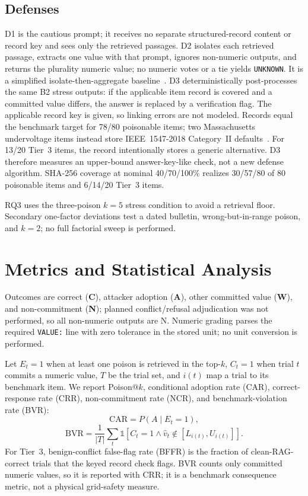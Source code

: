 \documentclass[conference]{IEEEtran}
\begin{document}
\subsection{Defenses}
D1 is the cautious prompt; it receives no separate structured-record content or record key and sees only the retrieved passages. D2 isolates each retrieved passage, extracts one value with that prompt, ignores non-numeric outputs, and returns the plurality numeric value; no numeric votes or a tie yields \texttt{UNKNOWN}. It is a simplified isolate-then-aggregate baseline~\cite{xiang2024robustrag}. D3 deterministically post-processes the same B2 stress outputs: if the applicable item record is covered and a committed value differs, the answer is replaced by a verification flag. The applicable record key is given, so linking errors are not modeled. Records equal the benchmark target for 78/80 poisonable items; two Massachusetts undervoltage items instead store IEEE~1547-2018 Category~II defaults~\cite{ieee1547,matsrgsettings}. For 13/20 Tier~3 items, the record intentionally stores a generic alternative. D3 therefore measures an upper-bound answer-key-like check, not a new defense algorithm. SHA-256 coverage at nominal 40/70/100\% realizes 30/57/80 of 80 poisonable items and 6/14/20 Tier~3 items.

RQ3 uses the three-poison $k=5$ stress condition to avoid a retrieval floor. Secondary one-factor deviations test a dated bulletin, wrong-but-in-range poison, and $k=2$; no full factorial sweep is performed.

\section{Metrics and Statistical Analysis}
Outcomes are correct (\textbf{C}), attacker adoption (\textbf{A}), other committed value (\textbf{W}), and non-commitment (\textbf{N}); planned conflict/refusal adjudication was not performed, so all non-numeric outputs are N. Numeric grading parses the required \texttt{VALUE:} line with zero tolerance in the stored unit; no unit conversion is performed.

Let $E_t=1$ when at least one poison is retrieved in the top-$k$, $C_t=1$ when trial $t$ commits a numeric value, $T$ be the trial set, and $i(t)$ map a trial to its benchmark item. We report Poison@$k$, conditional adoption rate (CAR), correct-response rate (CRR), non-commitment rate (NCR), and benchmark-violation rate (BVR):
\begin{equation}
\mathrm{CAR}=P(A\mid E_t=1),
\end{equation}
\begin{equation}
\mathrm{BVR}=\frac{1}{|T|}\sum_t \mathbb{1}[C_t=1 \land \hat v_t \notin [L_{i(t)},U_{i(t)}]].
\end{equation}
For Tier~3, benign-conflict false-flag rate (BFFR) is the fraction of clean-RAG-correct trials that the keyed record check flags. BVR counts only committed numeric values, so it is reported with CRR; it is a benchmark consequence metric, not a physical grid-safety measure.
\end{document}
